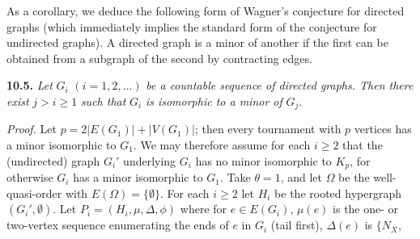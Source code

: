 As a corollary, we deduce the following form of Wagner's conjecture for directed graphs (which immediately implies the standard form of the conjecture for undirected graphs). A directed graph is a minor of another if the first can be obtained from a subgraph of the second by contracting edges.

\textbf{10.5.} \textit{Let} $G_i$ $(i = 1, 2, \dots)$ \textit{be a countable sequence of directed graphs. Then there exist} $j > i \ge 1$ \textit{such that} $G_i$ \textit{is isomorphic to a minor of} $G_j$.

\textit{Proof.} Let $p = 2|E(G_1)| + |V(G_1)|$; then every tournament with $p$ vertices has a minor isomorphic to $G_1$. We may therefore assume for each $i \ge 2$ that the (undirected) graph $G_i'$ underlying $G_i$ has no minor isomorphic to $K_p$, for otherwise $G_i$ has a minor isomorphic to $G_1$. Take $\theta = 1$, and let $\Omega$ be the well-quasi-order with $E(\Omega) = \{\emptyset\}$. For each $i \ge 2$ let $H_i$ be the rooted hypergraph $(G_i', \emptyset)$. Let $P_i = (H_i, \mu, \Delta, \phi)$ where for $e \in E(G_i)$, $\mu(e)$ is the one- or two-vertex sequence enumerating the ends of $e$ in $G_i$ (tail first), $\Delta(e)$ is $\{N_X$,
